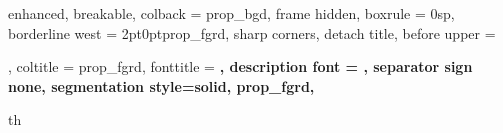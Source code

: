 \usepackage{amsmath, amssymb, amsthm, amsfonts, mathtools}
\usepackage{tikz, tikz-cd}
\usepackage{algorithmicx, algpseudocode, algorithm}
\usepackage{enumitem}
\usepackage{color, xcolor}
\usepackage{hyperref, graphicx}
\usepackage{mdframed, fancyhdr, parskip, titlesec}
\usepackage[margin=1in]{geometry}
\usepackage[english]{babel}
\usepackage[utf8]{inputenc}
\usepackage[sc]{mathpazo}
\usepackage{eulervm}

\newcommand{\header}[3]{\lhead{\textsc{#1}}\chead{\textsc{#2}}\rhead{\textsc{#3}}\pagestyle{fancy}}

\usepackage[most,many,breakable]{tcolorbox}

{%
	enhanced,
	breakable,
	colback = prop_bgd,
	frame hidden,
	boxrule = 0sp,
	borderline west = {2pt}{0pt}{prop_fgrd},
	sharp corners,
	detach title,
	before upper = \tcbtitle\par\smallskip,
	coltitle = prop_fgrd,
	fonttitle = \bfseries\sffamily,
	description font = \mdseries,
	separator sign none,
	segmentation style={solid, prop_fgrd},
}
{th}

\newcommand{\prop}[2]{\begin{Prop}{#1}{}#2\end{Prop}}
\newcommand{\qs}[2]{\setcounter{section}{1}{\large\textbf{#1:}} #2}

\newcommand{\pf}[1]{\begin{proof}#1 \end{proof}}
\newenvironment{myproof}[1][\proofname]{%
	\proof[Proof of Claim.]%
}{\endproof}
\newcommand{\pfcl}[1]{\begin{myproof}#1 \end{myproof}}
\newenvironment{mysol}[1][\proofname]{%
	\proof[Solution. ]%
}{\endproof}
\newcommand{\sol}[1]{\begin{mysol}#1 \end{mysol}\newpage}
\newcommand{\solnn}[1]{\begin{mysol}#1 \end{mysol}}

